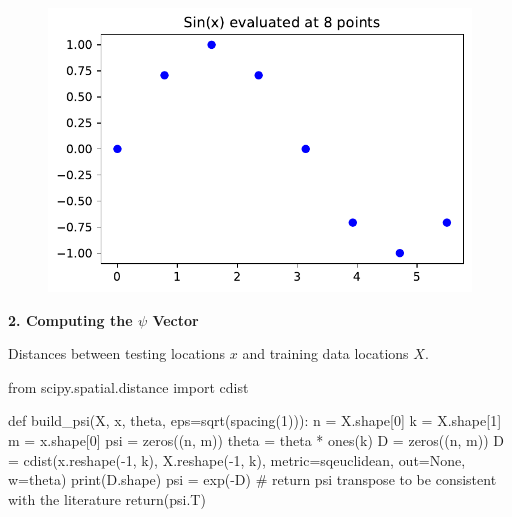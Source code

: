 \documentclass[
  letterpaper,
  DIV=11,
  numbers=noendperiod]{scrreprt}
\newenvironment{Shaded}{\begin{snugshade}}{\end{snugshade}}
\newcommand{\BuiltInTok}[1]{\textcolor[rgb]{0.00,0.23,0.31}{#1}}
\newcommand{\CommentTok}[1]{\textcolor[rgb]{0.37,0.37,0.37}{#1}}
\newcommand{\ControlFlowTok}[1]{\textcolor[rgb]{0.00,0.23,0.31}{#1}}
\newcommand{\DecValTok}[1]{\textcolor[rgb]{0.68,0.00,0.00}{#1}}
\newcommand{\ImportTok}[1]{\textcolor[rgb]{0.00,0.46,0.62}{#1}}
\newcommand{\KeywordTok}[1]{\textcolor[rgb]{0.00,0.23,0.31}{#1}}
\newcommand{\NormalTok}[1]{\textcolor[rgb]{0.00,0.23,0.31}{#1}}
\newcommand{\OperatorTok}[1]{\textcolor[rgb]{0.37,0.37,0.37}{#1}}
\newcommand{\StringTok}[1]{\textcolor[rgb]{0.13,0.47,0.30}{#1}}
\newcommand{\VariableTok}[1]{\textcolor[rgb]{0.07,0.07,0.07}{#1}}
\begin{document}
\begin{tcolorbox}
\begin{figure}[H]

{\centering \includegraphics{006_num_gp_files/figure-pdf/cell-53-output-1.pdf}

}

\end{figure}

\textbf{2. Computing the \(\psi\) Vector}

Distances between testing locations \(x\) and training data locations
\(X\).

\begin{Shaded}
\begin{Highlighting}[]
\ImportTok{from}\NormalTok{ scipy.spatial.distance }\ImportTok{import}\NormalTok{ cdist}

\KeywordTok{def}\NormalTok{ build\_psi(X, x, theta, eps}\OperatorTok{=}\NormalTok{sqrt(spacing(}\DecValTok{1}\NormalTok{))):}
\NormalTok{    n }\OperatorTok{=}\NormalTok{ X.shape[}\DecValTok{0}\NormalTok{]}
\NormalTok{    k }\OperatorTok{=}\NormalTok{ X.shape[}\DecValTok{1}\NormalTok{]}
\NormalTok{    m }\OperatorTok{=}\NormalTok{ x.shape[}\DecValTok{0}\NormalTok{]}
\NormalTok{    psi }\OperatorTok{=}\NormalTok{ zeros((n, m))}
\NormalTok{    theta }\OperatorTok{=}\NormalTok{ theta }\OperatorTok{*}\NormalTok{ ones(k)}
\NormalTok{    D }\OperatorTok{=}\NormalTok{ zeros((n, m))}
\NormalTok{    D }\OperatorTok{=}\NormalTok{ cdist(x.reshape(}\OperatorTok{{-}}\DecValTok{1}\NormalTok{, k),}
\NormalTok{              X.reshape(}\OperatorTok{{-}}\DecValTok{1}\NormalTok{, k),}
\NormalTok{              metric}\OperatorTok{=}\StringTok{\textquotesingle{}sqeuclidean\textquotesingle{}}\NormalTok{,}
\NormalTok{              out}\OperatorTok{=}\VariableTok{None}\NormalTok{,}
\NormalTok{              w}\OperatorTok{=}\NormalTok{theta)}
    \BuiltInTok{print}\NormalTok{(D.shape)}
\NormalTok{    psi }\OperatorTok{=}\NormalTok{ exp(}\OperatorTok{{-}}\NormalTok{D)}
    \CommentTok{\# return psi transpose to be consistent with the literature}
    \ControlFlowTok{return}\NormalTok{(psi.T)}
\end{Highlighting}
\end{Shaded}


\end{tcolorbox}
\end{document}
